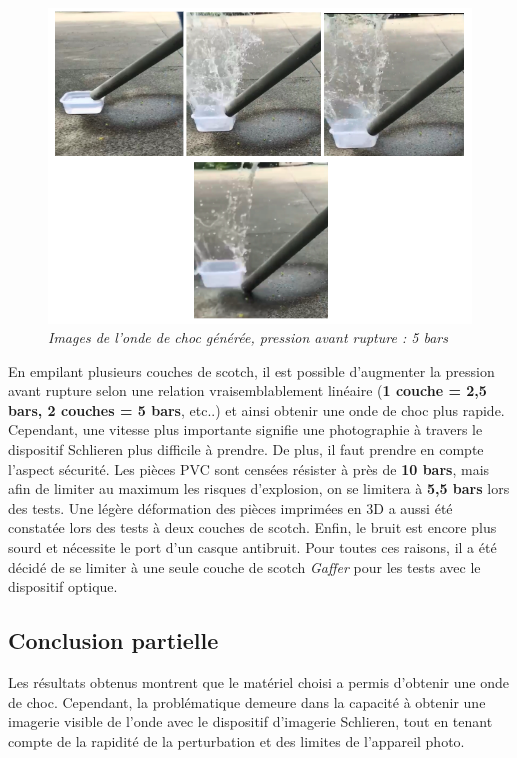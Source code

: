 \begin{figure}[H]
	\centering
	\includegraphics[scale = 0.5]{figures/choc_5bars.png}
	\caption{\small{\textit{Images de l'onde de choc générée, pression avant rupture : 5 bars}}}
	\label{fig:choc_5bars}
\end{figure}
En empilant plusieurs couches de scotch, il est possible d’augmenter la pression avant rupture selon une relation vraisemblablement linéaire (\textbf{1 couche = 2,5 bars, 2 couches = 5 bars}, etc..) et ainsi obtenir une onde de choc plus rapide. Cependant, une vitesse plus importante signifie une photographie à travers le dispositif Schlieren plus difficile à prendre. De plus, il faut prendre en compte l'aspect sécurité. Les pièces PVC sont censées résister à près de \textbf{10 bars}, mais afin de limiter au maximum les risques d'explosion, on se limitera à \textbf{5,5 bars} lors des tests. Une légère déformation des pièces imprimées en 3D a aussi été constatée lors des tests à deux couches de scotch. Enfin, le bruit est encore plus sourd et nécessite le port d'un casque antibruit. Pour toutes ces raisons, il a été décidé de se limiter à une seule couche de scotch \textit{Gaffer} pour les tests avec le dispositif optique.
\subsection{Conclusion partielle}
Les résultats obtenus montrent que le matériel choisi a permis d'obtenir une onde de choc. Cependant, la problématique demeure dans la capacité à obtenir une imagerie visible de l'onde avec le dispositif d'imagerie Schlieren, tout en tenant compte de la rapidité de la perturbation et des limites de l'appareil photo.